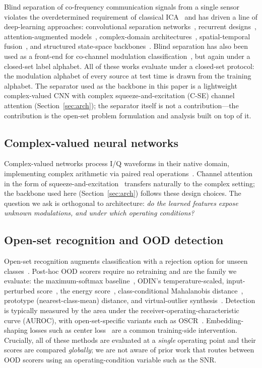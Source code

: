 \documentclass[review,12pt]{elsarticle}
\begin{document}
Blind separation of co-frequency communication signals from a single
sensor violates the overdetermined requirement of classical
ICA~\cite{hyvarinen2000ica} and has
driven a line of deep-learning approaches: convolutional separation
networks~\cite{hou2022single}, recurrent
designs~\cite{chen2019deep}, attention-augmented
models~\cite{ma2023novel}, complex-domain
architectures~\cite{guo2024single}, spatial-temporal
fusion~\cite{luo2023single}, and structured state-space
backbones~\cite{s4unet2026}.
Blind separation has also been used as a front-end for co-channel
modulation classification~\cite{deng2024co}, but again under a
closed-set label alphabet.
All of these works evaluate under a closed-set protocol: the modulation
alphabet of every source at test time is drawn from the training
alphabet. The separator used as the backbone in this paper is a
lightweight complex-valued CNN with complex squeeze-and-excitation
(C-SE) channel attention (Section~\ref{sec:arch}); the separator itself
is not a contribution---the contribution is the open-set problem
formulation and analysis built on top of it.

\subsection{Complex-valued neural networks}

Complex-valued networks process I/Q waveforms in their native domain,
implementing complex arithmetic via paired real
operations~\cite{trabelsi2018complex,lee2022complex}. Channel attention
in the form of squeeze-and-excitation~\cite{hu2018senet} transfers
naturally to the complex setting; the backbone used here
(Section~\ref{sec:arch}) follows these design choices. The question we
ask is orthogonal to architecture: \emph{do the learned features expose
unknown modulations, and under which operating conditions?}

\subsection{Open-set recognition and OOD detection}

Open-set recognition augments classification with a rejection option for
unseen classes~\cite{scheirer2013open,bendale2016openmax}. Post-hoc OOD scorers require
no retraining and are the family we evaluate: the maximum-softmax
baseline~\cite{hendrycks2017msp}, ODIN's temperature-scaled,
input-perturbed score~\cite{liang2018odin}, the energy
score~\cite{liu2020energy}, class-conditional Mahalanobis
distance~\cite{lee2018mahalanobis}, prototype (nearest-class-mean)
distance, and virtual-outlier synthesis~\cite{du2022vos}. Detection is
typically measured by the area under the receiver-operating-characteristic
curve (AUROC), with open-set-specific variants such as
OSCR~\cite{dhamija2018oscr}. Embedding-shaping losses such as center
loss~\cite{wen2016center} are a common training-side intervention.
Crucially, all of these methods are evaluated at a \emph{single}
operating point and their scores are compared \emph{globally}; we are
not aware of prior work that routes between OOD scorers using an
operating-condition variable such as the SNR.
\end{document}
